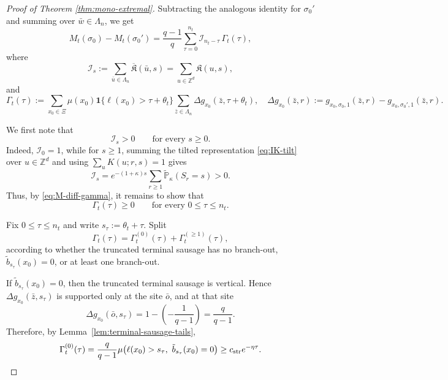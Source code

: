 \documentclass[letterpaper,11pt,reqno]{amsart}
\theoremstyle{definition}
\newcommand{\IK}{\mathfrak{K}}
\begin{document}
\begin{proof}[Proof of Theorem \ref{thm:mono-extremal}]
Subtracting the analogous identity for \(\sigma_0'\) and summing over \(\bar w\in\Lambda_n\), we get
\begin{equation}\label{eq:M-diff-gamma}
M_t(\sigma_0)-M_t(\sigma_0')
=
\frac{q-1}{q}
\sum_{\tau=0}^{n_t}\mathcal I_{n_t-\tau}\,\Gamma_t(\tau),
\end{equation}
where
\[
\mathcal I_s
:=
\sum_{\bar u\in\Lambda_n}\overline{\IK}(\bar u,s)
=
\sum_{u\in\mathbb Z^d}\IK(u,s),
\]
and
\[
\Gamma_t(\tau)
:=
\sum_{x_0\in\Xi}\mu(x_0)\mathbf 1\{\ell(x_0)>\tau+\theta_t\}
\sum_{\bar z\in\Lambda_n}
\Delta g_{x_0}(\bar z,\tau+\theta_t),
\quad
\Delta g_{x_0}(\bar z,r)
:=
g_{x_0,\sigma_0,1}(\bar z,r)-g_{x_0,\sigma_0',1}(\bar z,r).
\]


We first note that
\[
\mathcal I_s>0
\qquad\text{for every }s\ge0.
\]
Indeed, \(\mathcal I_0=1\), while for \(s\ge1\), summing the tilted representation
\eqref{eq:IK-tilt} over \(u\in\mathbb Z^d\) and using
\(\sum_u K(u;r,s)=1\) gives
\[
\mathcal I_s
=
e^{-(1+\kappa)s}
\sum_{r\ge1}\widetilde{\mathbb P}_\kappa(S_r=s)>0.
\]
Thus, by \eqref{eq:M-diff-gamma}, it remains to show that
\begin{equation}\label{eq:Gamma-nonnegative}
\Gamma_t(\tau)\ge0
\qquad\text{for every }0\le \tau\le n_t.
\end{equation}

Fix \(0\le \tau\le n_t\) and write \(s_\tau:=\theta_t+\tau\). Split
\[
\Gamma_t(\tau)=\Gamma_t^{(0)}(\tau)+\Gamma_t^{(\ge1)}(\tau),
\]
according to whether the truncated terminal sausage has no branch-out,
\(\tilde b_{s_\tau}(x_0)=0\), or at least one branch-out.

If \(\tilde b_{s_\tau}(x_0)=0\), then the truncated terminal sausage is vertical. Hence
\(\Delta g_{x_0}(\bar z,s_\tau)\) is supported only at the site \(\bar o\), and at that site
\[
\Delta g_{x_0}(\bar o,s_\tau)
=
1-\left(-\frac1{q-1}\right)
=
\frac q{q-1}.
\]
Therefore, by Lemma~\ref{lem:terminal-sausage-tails},
\[
\Gamma_t^{(0)}(\tau)
=
\frac q{q-1}
\mu\bigl(\ell(x_0)>s_\tau,\ \tilde b_{s_\tau}(x_0)=0\bigr)
\ge
c_{\rm str}e^{-\eta\tau}.
\]



\end{proof}
\end{document}
